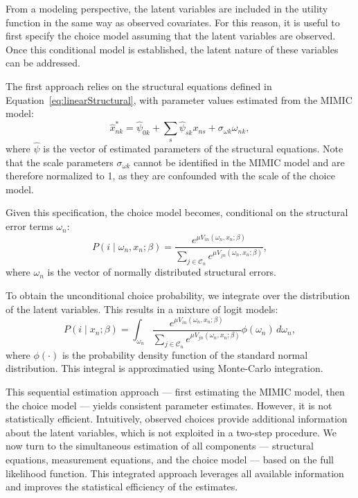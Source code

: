 \documentclass[12pt,a4paper]{article}
\begin{document}
From a modeling perspective, the latent variables are included in the utility function in the same way as observed covariates. For this reason, it is useful to first specify the choice model assuming that the latent variables are observed. Once this conditional model is established, the latent nature of these variables can be addressed.

The first approach relies on the structural equations defined in Equation~\eqref{eq:linearStructural}, with parameter values estimated from the MIMIC model:
\begin{equation}
 \widehat{x}_{nk}^* = \widehat{\psi}_{0k} + \sum_s \widehat{\psi}_{sk} x_{ns} + \sigma_{\omega k} \omega_{nk},
\end{equation}
where \( \widehat{\psi} \) is the vector of estimated parameters of the structural equations. Note that the scale parameters \( \sigma_{\omega k} \) cannot be identified in the MIMIC model and are therefore normalized to 1, as they are confounded with the scale of the choice model.

Given this specification, the choice model becomes, conditional on the structural error terms \( \omega_n \):
\begin{equation}
P(i \mid \omega_n, x_n; \beta) = \frac{e^{\mu V_{in}(\omega_n, x_n; \beta)}}{\sum_{j \in \mathcal{C}_n} e^{\mu V_{jn}(\omega_n, x_n; \beta)}},
\end{equation}
where \( \omega_n \) is the vector of normally distributed structural errors.

To obtain the unconditional choice probability, we integrate over the distribution of the latent variables. This results in a mixture of logit models:
\begin{equation}
P(i \mid x_n; \beta) = \int_{\omega_n} \frac{e^{\mu V_{in}(\omega_n, x_n; \beta)}}{\sum_{j \in \mathcal{C}_n} e^{\mu V_{jn}(\omega_n, x_n; \beta)}} \phi(\omega_n) \, d\omega_n,
\end{equation}
where \( \phi(\cdot) \) is the probability density function of the standard normal distribution.
This integral is approximatied using Monte-Carlo integration.

This sequential estimation approach --- first estimating the MIMIC model, then the choice model --- yields consistent parameter estimates. However, it is not statistically efficient. Intuitively, observed choices provide additional information about the latent variables, which is not exploited in a two-step procedure. We now turn to the simultaneous estimation of all components --- structural equations, measurement equations, and the choice model --- based on the full likelihood function. This integrated approach leverages all available information and improves the statistical efficiency of the estimates.
\end{document}
